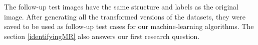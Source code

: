 The follow-up test images have the same structure and labels as the original image. After generating all the transformed versions of the datasets, they were saved to be used as follow-up test cases for our machine-learning algorithms. The section \ref{identifyingMR} also answers our first research question.
